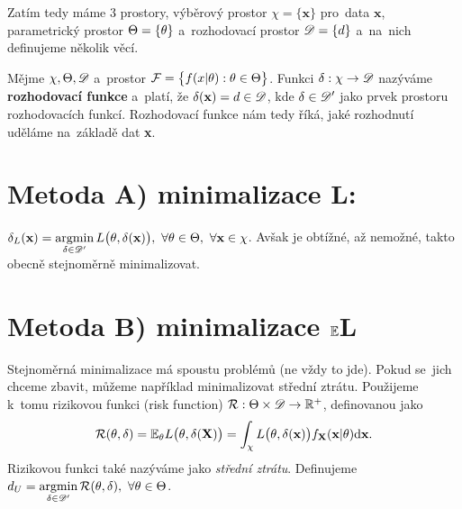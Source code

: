 Zatím tedy máme 3 prostory, výběrový prostor $\chi= \{\textbf{x}\}$ pro~data $\textbf{x}$, parametrický prostor $\Theta=\{\theta\}$ a~rozhodovací prostor $\mathscr{D}= \{d\}$ a~na~nich definujeme několik věcí.
\begin{define}
	Mějme $\chi,\Theta,\mathscr{D}$ a~prostor  $\mathcal{F}=\big\{ f(x|\theta):\theta\in\Theta \big\}$. Funkci $\delta:\chi\to\mathscr{D} $ nazýváme \textbf{rozhodovací funkce} a~platí, že $\delta(\textbf{x})=d\in\mathscr{D} $, kde $\delta\in\mathscr{D}'$ jako prvek prostoru rozhodovacích funkcí.  Rozhodovací funkce nám tedy říká, jaké rozhodnutí uděláme na~základě dat \textbf{x}.
\end{define}

\section{Metoda A) minimalizace L:} $\delta_L(\textbf{x})=\mathop{\mathrm{argmin}}\limits_{\delta\in\mathscr{D}'} L\big(\theta,\delta(\textbf{x})\big),~\forall \theta\in\Theta,~\forall\textbf{x}\in\chi$. Avšak je obtížné, až nemožné, takto obecně stejnoměrně minimalizovat.

\section{Metoda B) minimalizace $\mathbb{E} $L}
Stejnoměrná minimalizace má spoustu problémů (ne vždy to jde). Pokud se~jich chceme zbavit, můžeme například minimalizovat střední ztrátu. Použijeme k~tomu rizikovou funkci (risk function) $\mathcal{R}:\Theta\times\mathscr{D} \to\mathbb{R}^+$, definovanou jako $$\mathcal{R}(\theta,\delta)=\mathbb{E}_\theta L\big(\theta,\delta(\textbf{X})\big)=\int_\chi L\big(\theta,\delta(\textbf{x})\big)f_\textbf{X}(\textbf{x}|\theta)\mathrm{d}\textbf{x}.$$
Rizikovou funkci také nazýváme jako \textit{střední ztrátu}. Definujeme $d_U=\mathop{\mathrm{argmin}}\limits_{\delta\in\mathscr{D}' } \mathcal{R}(\theta,\delta),~\forall\theta\in\Theta$.

